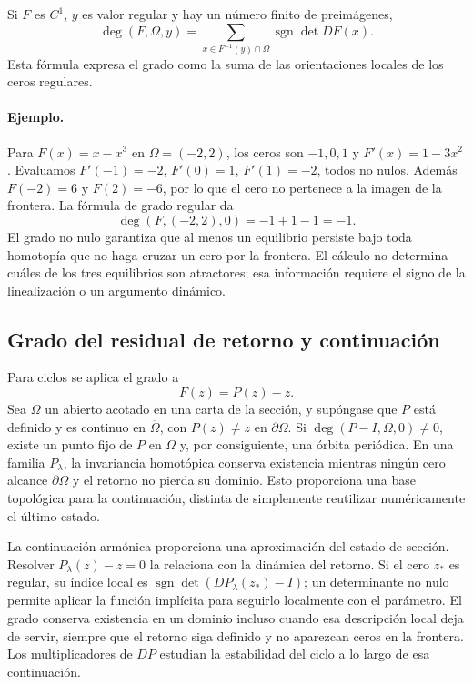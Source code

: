 Si $F$ es $C^1$, $y$ es valor regular y hay un número finito de preimágenes,
\begin{equation}
 \deg(F,\Omega,y)=
 \sum_{x\in F^{-1}(y)\cap\Omega}
 \operatorname{sgn}\det DF(x).
 \label{eq:guide-degree-regular}
\end{equation}
Esta fórmula expresa el grado como la suma de las orientaciones locales de
los ceros regulares.

\paragraph{Ejemplo.}
Para $F(x)=x-x^3$ en $\Omega=(-2,2)$, los ceros son $-1,0,1$ y
\(F'(x)=1-3x^2\). Evaluamos
\(F'(-1)=-2\), \(F'(0)=1\), \(F'(1)=-2\), todos no nulos.
Además \(F(-2)=6\) y \(F(2)=-6\), por lo que el cero no pertenece a
la imagen de la frontera. La fórmula de grado regular da
\[
 \deg(F,(-2,2),0)=-1+1-1=-1.
\]
El grado no nulo garantiza que al menos un equilibrio persiste bajo toda
homotopía que no haga cruzar un cero por la frontera. El cálculo no determina
cuáles de los tres equilibrios son atractores; esa información requiere el
signo de la linealización o un argumento dinámico.

\subsection{Grado del residual de retorno y continuación}

Para ciclos se aplica el grado a
\begin{equation}
 F(z)=P(z)-z.
 \label{eq:guide-degree-return}
\end{equation}
Sea \(\Omega\) un abierto acotado en una carta de la sección, y supóngase
que \(P\) está definido y es continuo en \(\overline\Omega\), con
\(P(z)\ne z\) en \(\partial\Omega\). Si
$\deg(P-I,\Omega,0)\neq0$, existe un punto fijo de $P$ en $\Omega$ y, por
consiguiente, una órbita periódica.
En una familia $P_\lambda$, la invariancia homotópica conserva existencia
mientras ningún cero alcance $\partial\Omega$ y el retorno no pierda su
dominio. Esto proporciona una base topológica para la continuación, distinta
de simplemente reutilizar numéricamente el último estado.

La continuación armónica proporciona una aproximación del estado de
sección. Resolver \(P_\lambda(z)-z=0\) la relaciona con la dinámica del
retorno. Si el cero \(z_*\) es regular, su índice local es
\(\operatorname{sgn}\det(DP_\lambda(z_*)-I)\); un determinante no nulo
permite aplicar la función implícita para seguirlo localmente con el
parámetro. El grado conserva existencia en un dominio incluso cuando esa
descripción local deja de servir, siempre que el retorno siga definido y
no aparezcan ceros en la frontera. Los multiplicadores de \(DP\) estudian
la estabilidad del ciclo a lo largo de esa continuación.

